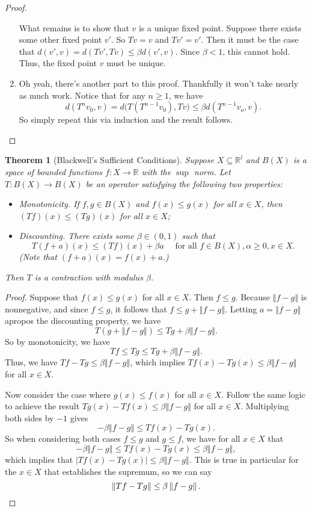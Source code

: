 \documentclass[12pt]{article}
\newcommand{\R}{\mathbb{R}}
\newcommand{\norm}[1]{\left\Vert{#1}\right\Vert}
\newcommand{\abs}[1]{\left\vert{#1}\right\vert}
\newtheorem{theorem}{Theorem}
\theoremstyle{definition}
\begin{document}
\begin{proof}
\begin{enumerate}
What remains is to show that $v$ is a unique fixed point. Suppose there exists some other fixed point $v'$. So $Tv=v$ and $Tv'=v'$. Then it must be the case that  $d(v', v) = d(Tv', Tv) \leq \beta d(v', v)$. Since $\beta < 1$, this cannot hold. Thus, the fixed point $v$ must be unique.

 \item Oh yeah, there's another part to this proof. Thankfully it won't take nearly as much work. Notice that for any $n \geq 1$, we have
	\[d(T^nv_0,v) = d\big( T(T^{n-1}v_0), Tv\big)  \leq \beta d(T^{n-1}v_o, v).	\]
	So simply repeat this via induction and the result follows. \qedhere
\end{enumerate}
\end{proof} 

\begin{theorem}[Blackwell's Sufficient Conditions]
Suppose $X \subseteq \R^l$ and $B(X)$ is a space of bounded functions $f:X \rightarrow \R$ with the $\sup$ norm. Let $T: B(X) \rightarrow B(X)$ be an operator satisfying the following two properties:
\begin{itemize}
	\item \emph{Monotonicity}. If $f, g\in  B(X)$ and $f(x) \leq g(x)$ for all $x \in X$, then $(Tf)(x) \leq (Tg)(x)$ for all $x \in X$;
	\item \emph{Discounting}. There exists some $\beta \in (0,1)$ such that
		\[	T(f + a)(x) \leq (Tf)(x) + \beta a \quad \text{ for all } f \in B(X), \alpha \geq 0, x\in X.\]
		(Note that $(f+a)(x) = f(x) + a$.)
\end{itemize}
Then $T$ is a contraction with modulus $\beta$. 
\end{theorem}
\begin{proof}
	Suppose that $f(x) \leq g(x)$ for all $x \in X$. Then $f \leq g$. Because $\norm{f-g}$ is nonnegative, and since $f \leq g$, it follows that $f \leq g + \norm{f-g}$. Letting $a = \norm{f-g}$ apropos the discounting property, we have
	\[	T(g + \norm{f-g}) \leq Tg + \beta \norm{f-g}.	\]
So by monotonicity, we have
	\[	Tf \leq Tg \leq Tg + \beta \norm{f-g}. \]
Thus, we have $Tf - Tg \leq \beta \norm{f-g}$, which implies $Tf(x) - Tg(x) \leq  \beta \norm{f-g}$ for all $x \in X$.

Now consider the case where $g(x) \leq f(x)$ for all $x \in X$. Follow the same logic to achieve the result $Tg(x) - Tf(x) \leq  \beta \norm{f-g}$ for all $x \in X$. Multiplying both sides by $-1$ gives
	\[ 	-\beta \norm{f-g} \leq Tf(x)-Tg(x).\]
So when considering both cases $f \leq g$ and $g \leq f$, we have for all $x \in X$ that
	\[-\beta \norm{f-g} \leq Tf(x)-Tg(x)\leq \beta \norm{f-g}, \]
which implies that $\abs{Tf(x) - Tg(x)} \leq \beta \norm{f-g}$. This is true in particular for the $x \in X$ that establishes the supremum, so we can say
	\[ \norm{Tf - Tg} \leq \beta \norm{f-g}.	\qedhere \]
\end{proof}
\end{document}
